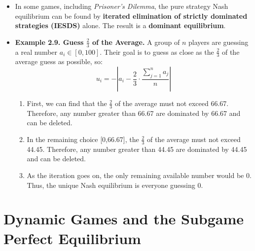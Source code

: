\documentclass[notitlepage]{article}
\begin{document}
\begin{itemize}
    \item In some games, including \textit{Prisoner's Dilemma}, the pure strategy Nash equilibrium can be found by \textbf{iterated elimination of strictly dominated strategies (IESDS)} alone. The result is a \textbf{dominant equilibrium}.
    \item \textbf{Example 2.9. Guess \(\frac{2}{3}\) of the Average.} A group of \(n\) players are guessing a real number \(a_i \in [0,100]\). Their goal is to guess as close as the \(\frac{2}{3}\) of the average guess as possible, so:
    \[
    u_i = -\left|a_i - \frac{2}{3}\cdot\frac{\sum^n_{j=1} a_j}{n}\right|
    \]
    \begin{enumerate}
        \item First, we can find that the \(\frac{2}{3}\) of the average must not exceed 66.67. Therefore, any number greater than 66.67 are dominated by 66.67 and can be deleted.
        \item In the remaining choice [0,66.67], the \(\frac{2}{3}\) of the average must not exceed 44.45. Therefore, any number greater than 44.45 are dominated by 44.45 and can be deleted.
        \item As the iteration goes on, the only remaining available number would be 0. Thus, the unique Nash equilibrium is everyone guessing 0.
    \end{enumerate}

\end{itemize}

\section{Dynamic Games and the Subgame Perfect Equilibrium}
\end{document}
